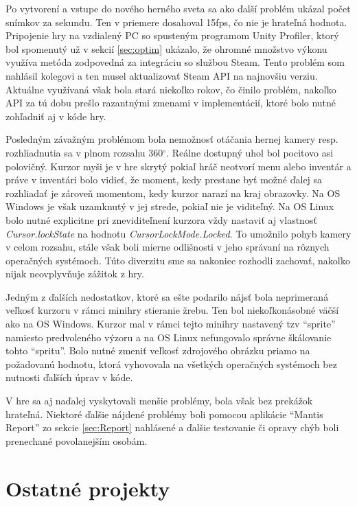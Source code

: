 \documentclass[slovak, bachelorpractice]{diploma}
\begin{document}
Po vytvorení a vstupe do nového herného sveta sa ako ďalší problém ukázal počet snímkov za sekundu. Ten v priemere dosahoval 15fps, čo nie je hrateľná hodnota. Pripojenie hry na vzdialený PC so spusteným programom Unity Profiler, ktorý bol spomenutý už v sekcií \ref{sec:optim} ukázalo, že ohromné množstvo výkonu využíva metóda zodpovedná za integráciu so službou Steam. Tento problém som nahlásil kolegovi a ten musel aktualizovať Steam API na najnovšiu verziu. Aktuálne využívaná však bola stará niekoľko rokov, čo činilo problém, nakoľko API za tú dobu prešlo razantnými zmenami v implementácií, ktoré bolo nutné zohľadniť aj v kóde hry.

Posledným závažným problémom bola nemožnosť otáčania hernej kamery resp. rozhliadnutia sa v plnom rozsahu 360$^{\circ}$. Reálne dostupný uhol bol pocitovo asi polovičný. Kurzor myši je v hre skrytý pokiaľ hráč neotvorí menu alebo inventár a práve v inventári bolo vidieť, že moment, kedy prestane byť možné ďalej sa rozhliadať je zároveň momentom, kedy kurzor narazí na kraj obrazovky. Na OS Windows je však uzamknutý v jej strede, pokiaľ nie je viditeľný. Na OS Linux bolo nutné explicitne pri zneviditeľnení kurzora vždy nastaviť aj vlastnosť \textit{Cursor.lockState} na hodnotu \textit{CursorLockMode.Locked}. To umožnilo pohyb kamery v celom rozsahu, stále však boli mierne odlišnosti v jeho správaní na rôznych operačných systémoch. Túto diverzitu sme sa nakoniec rozhodli zachovať, nakoľko nijak neovplyvňuje zážitok z hry.

Jedným z ďalších nedostatkov, ktoré sa ešte podarilo nájsť bola neprimeraná veľkosť kurzoru v rámci minihry stieranie žrebu. Ten bol niekoľkonásobné väčší ako na OS Windows. Kurzor mal v rámci tejto minihry nastavený tzv \enquote{sprite} namiesto predvoleného výzoru a na OS Linux nefungovalo správne škálovanie tohto \enquote{spritu}. Bolo nutné zmeniť veľkosť zdrojového obrázku priamo na požadovanú hodnotu, ktorá vyhovovala na všetkých operačných systémoch bez nutnosti ďalších úprav v kóde.

V hre sa aj naďalej vyskytovali menšie problémy, bola však bez prekážok hrateľná. Niektoré ďalšie nájdené problémy boli pomocou aplikácie \enquote{Mantis Report} zo sekcie \ref{sec:Report} nahlásené a ďalšie testovanie či opravy chýb boli prenechané povolanejším osobám.

\section{Ostatné projekty}
\label{sec:Others}
\end{document}

